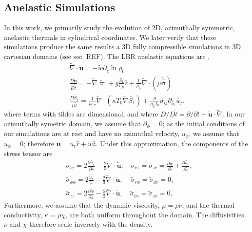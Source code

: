 \documentclass[twocolumn, amsmath, amsfonts, amssymb, trackchanges]{aastex62}
\newcommand{\td}[1]{\ensuremath{\widetilde{#1}}}
\newcommand{\grad}{\ensuremath{\nabla}}
\newcommand{\lilstressT}{\ensuremath{\bm{\bar{\bar{\sigma}}}}}
\begin{document}
\subsection{Anelastic Simulations}
In this work, we primarily study the evolution of 2D, azimuthally symmetric, anelastic
thermals in cylindrical coordinates. 
We later verify that these simulations produce the same results a 3D fully compressible
simulations in 3D cartesian domains (see sec. REF). 
The LBR anelastic equations are \citep{lecoanet&all2014},
\begin{gather}
\td{\grad}\cdot\td{\bm{u}} = -\td{w}\partial_{\tilde{z}} \ln\rho_0 \\
\frac{D \td{\bm{u}}}{D \td{t}} = -\td{\grad} \td{\varpi} + g\frac{\td{S_1}}{c_P}\hat{z} + \frac{1}{\rho_0}\td{\grad}\cdot\left(\mu\td{\lilstressT}\right) \\
\frac{D \td{S_1}}{D\td{t}} = \frac{1}{\rho c_P}\td{\grad}\cdot\left(\kappa T_0 \td{\grad} \td{S_1}\right) + \frac{\mu}{\rho_0 T_0}\td{\sigma_{ij}}\partial_{\td{x_i}}\td{u_j}.
\end{gather}
where terms with tildes are dimensional, and where
$D/D\td{t} = \partial/\partial \td{t} + \td{\bm{u}}\cdot\td{\grad}$. In our azimuthally symetric
domain, we assume that $\partial_\phi = 0$; as the initial conditions of our simulations are at rest and have
no azimuthal velocity, $u_\phi$, we assume that $u_\phi = 0$; therefore $\bm{u} = u_r \hat{r} + w\hat{z}$. 
Under this approximation, the components of the stress tensor are
\begin{equation}
\begin{split}
&\td{\sigma}_{rr} = 2\frac{\partial \td{u_r}}{\partial \td{r}} - \frac{2}{3}\td{\grad}\cdot\td{\bm{u}},\,\,\,\,\,\,
\td{\sigma}_{rz}     = \td{\sigma}_{zr} = \frac{\partial \td{w}}{\partial \td{r}} + \frac{\partial \td{u_r}}{\partial \td{z}}, \\
&\td{\sigma}_{\phi\phi} = 2\frac{\td{u_r}}{\td{r}} - \frac{2}{3}\td{\grad}\cdot\td{\bm{u}},\,\,\,\,\,\,\,
\td{\sigma}_{r\phi}  = \td{\sigma}_{\phi r}  = 0, \\
&\td{\sigma}_{zz}       = 2\frac{\partial \td{w}}{\partial \td{z}} - \frac{2}{3}\td{\grad}\cdot\td{\bm{u}}, \,\,\,\,\,\,
\td{\sigma}_{\phi z} = \td{\sigma}_{z \phi}  = 0,\qquad
\end{split}
\end{equation}
Furthermore, we assume that the dynamic viscosity, $\mu = \rho \nu$, and the
thermal conductivity, $\kappa = \rho \chi$, are both uniform throughout the domain.
The diffusivities
$\nu$ and $\chi$ therefore scale inversely with the density.
\end{document}
